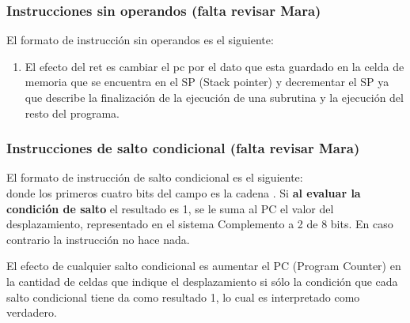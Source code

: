\subsubsection{Instrucciones sin operandos  (falta revisar Mara)}

El formato de instrucción sin operandos es el siguiente:\\



\begin{enumerate}
\item  {}
El efecto del ret es cambiar el pc por el dato que esta guardado en la celda de memoria que se encuentra en el SP (Stack pointer) y decrementar el SP ya que describe la finalización de la ejecución de una subrutina y la ejecución del resto del programa.
\end{enumerate}


\subsubsection{Instrucciones de salto condicional  (falta revisar Mara)}

El formato de instrucción de salto condicional es el siguiente:\\

 donde los primeros cuatro bits del campo  es la cadena . Si \textbf{al evaluar la condición de salto} el resultado es 1, se le suma al PC el valor del desplazamiento, representado en el sistema Complemento a 2 de 8 bits. En caso contrario la instrucción no hace nada.


El efecto de cualquier salto condicional es aumentar el PC (Program Counter) en la cantidad de celdas que indique el desplazamiento si sólo la condición que cada salto condicional tiene da como resultado 1, lo cual es interpretado como verdadero.

